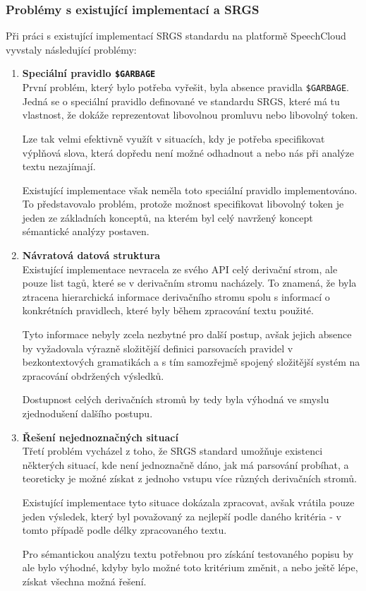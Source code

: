 \subsubsection{Problémy s existující implementací a SRGS}
Při práci s existující implementací SRGS standardu na platformě SpeechCloud vyvstaly následující problémy:
\begin{enumerate}
	\item \textbf{Speciální pravidlo \texttt{\$GARBAGE}}\\
	      První problém, který bylo potřeba vyřešit, byla absence pravidla \texttt{\$GARBAGE}.
	      Jedná se o speciální pravidlo definované ve standardu SRGS, které má tu vlastnost, že dokáže reprezentovat libovolnou promluvu nebo libovolný token.

	      Lze tak velmi efektivně využít v situacích, kdy je potřeba specifikovat výplňová slova,
	      která dopředu není možné odhadnout a nebo nás při analýze textu nezajímají.

	      Existující implementace však neměla toto speciální pravidlo implementováno.
	      To představovalo problém, protože možnost specifikovat libovolný token je jeden ze základních konceptů,
	      na kterém byl celý navržený koncept sémantické analýzy postaven.
	\item \textbf{Návratová datová struktura}\\
	      Existující implementace nevracela ze svého API celý derivační strom, ale pouze list tagů, které se v derivačním stromu nacházely.
	      To znamená, že byla ztracena hierarchická informace derivačního stromu spolu s informací o konkrétních pravidlech,
	      které byly během zpracování textu použité.

	      Tyto informace nebyly zcela nezbytné pro další postup, avšak jejich absence by
	      vyžadovala výrazně složitější definici parsovacích pravidel v bezkontextových gramatikách a
	      s tím samozřejmě spojený složitější systém na zpracování obdržených výsledků.

	      Dostupnost celých derivačních stromů by tedy byla výhodná ve smyslu zjednodušení dalšího postupu.
	\item \textbf{Řešení nejednoznačných situací}\\
	      Třetí problém vycházel z toho, že SRGS standard umožňuje existenci některých situací,
	      kde není jednoznačně dáno, jak má parsování probíhat,
	      a teoreticky je možné získat z jednoho vstupu více různých derivačních stromů.


	      Existující implementace tyto situace dokázala zpracovat, avšak vrátila pouze jeden výsledek,
	      který byl považovaný za nejlepší podle daného kritéria - v tomto případě podle délky zpracovaného textu.

	      Pro sémantickou analýzu textu potřebnou pro získání testovaného popisu by ale bylo výhodné,
	      kdyby bylo možné toto kritérium změnit, a nebo ještě lépe, získat všechna možná řešení.
\end{enumerate}

